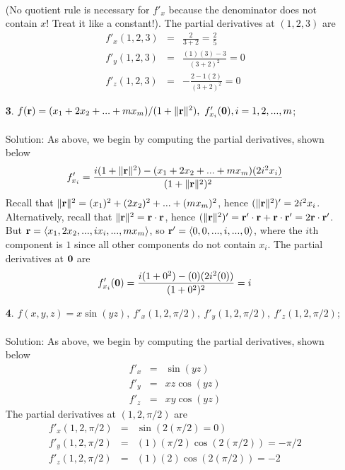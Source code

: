 \documentclass[12pt]{amsbook}
\newcommand{\la}{\langle}
\newcommand{\ra}{\rangle}
\begin{document}
\begin{enumerate}
\begin{eqnarray*}
\end{eqnarray*}
(No quotient rule is necessary for $f'_x$ because the denominator does not contain $x$! Treat it like a constant!). The partial derivatives at $(1,2,3)$ are
\begin{eqnarray*}
f'_x(1,2,3)&=&\frac{2}{3+2}=\frac{2}{5} \\
f'_y(1,2,3)&=&\frac{(1)(3)-3}{(3+2)^2}=0 \\
f'_z(1,2,3)&=&-\frac{2-1(2)}{(3+2)^2}=0
\end{eqnarray*}
\item[{\small\bf 3}.] $f({\bf r})=(x_1+2x_2+...+mx_m)/(1+\|{\bf r}\|^2) , \ f'_{x_i}({\bf 0}), i=1,2,...,m$; 
\\
\\
{\sc Solution}: As above, we begin by computing the partial derivatives, shown below
\begin{eqnarray*}
f'_{x_i}=\frac{i(1+\|{\bf r}\|^2)-(x_1+2x_2+...+mx_m)(2i^2x_i)}{(1+\|{\bf r}\|^2)^2}
\end{eqnarray*}
Recall that $\|{\bf r}\|^2=(x_1)^2+(2x_2)^2+...+(mx_m)^2$, hence $(\|{\bf r}\|^2)'=2i^2x_i$. Alternatively, recall that $\|{\bf r}\|^2={\bf r}\cdot {\bf r}$, hence $(\|{\bf r}\|^2)'={\bf r}'\cdot {\bf r}+{\bf r}\cdot{\bf r}'=2{\bf r}\cdot{\bf r}'$. But ${\bf r}=\la x_1,2x_2,...,ix_i,...,mx_m \ra$, so ${\bf r}'=\la 0,0,...,i,...,0 \ra$, where the $i$th component is $1$ since all other components do not contain $x_i$.  The partial derivatives at ${\bf 0}$ are
\begin{eqnarray*}
f'_{x_i}({\bf 0})=\frac{i(1+0^2)-(0)(2i^2(0))}{(1+0^2)^2}=i
\end{eqnarray*}
\item[{\small\bf 4}.] $f(x,y,z)=x\sin(yz), \ f'_x(1,2,\pi/2), \ f'_y(1,2,\pi/2), \ f'_z(1,2,\pi/2)$; 
\\
\\
{\sc Solution}: As above, we begin by computing the partial derivatives, shown below
\begin{eqnarray*}
f'_x&=&\sin(yz) \\
f'_y&=&xz\cos(yz) \\
f'_z&=&xy\cos(yz)
\end{eqnarray*}
The partial derivatives at $(1,2,\pi/2)$ are
\begin{eqnarray*}
f'_x(1,2,\pi/2)&=&\sin(2(\pi/2)=0) \\
f'_y(1,2,\pi/2)&=&(1)(\pi/2)\cos(2(\pi/2))=-\pi/2 \\
f'_z(1,2,\pi/2)&=&(1)(2)\cos(2(\pi/2))=-2
\end{eqnarray*}

\end{enumerate}
\end{document}
